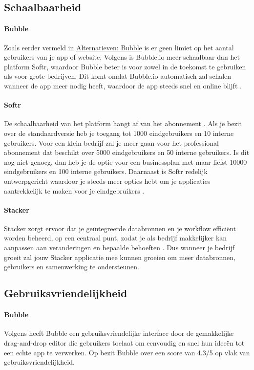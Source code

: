 \subsection{Schaalbaarheid}%
\label{subsec:schaalbaarheid}
\paragraph{Bubble}
Zoals eerder vermeld in \hyperref[subsec:bubble]{Alternatieven: Bubble} is er geen limiet op het aantal gebruikers van je app of website. Volgens \textcite{Youssef2023} is 
Bubble.io meer schaalbaar dan het platform Softr, waardoor Bubble beter is voor zowel in de toekomst te gebruiken als voor grote bedrijven. 
Dit komt omdat Bubble.io automatisch zal schalen wanneer de app meer nodig heeft, 
waardoor de app steeds snel en online blijft \autocite{Bas2024}.
\paragraph{Softr}
De schaalbaarheid van het platform hangt af van het abonnement \autocite{Frater2024}. 
Als je bezit over de standaardversie heb je toegang tot 1000 eindgebruikers en 10 interne gebruikers. 
Voor een klein bedrijf zal je meer gaan voor het professional abonnement dat beschikt over 5000 eindgebruikers en 50 interne gebruikers. Is dit nog niet genoeg, 
dan heb je de optie voor een businessplan met maar liefst 10000 eindgebruikers en 100 interne gebruikers. Daarnaast is Softr redelijk ontwerpgericht waardoor je steeds 
meer opties hebt om je applicaties aantrekkelijk te maken voor je eindgebruikers \autocite{Noloco2023}.
\paragraph{Stacker}
Stacker zorgt ervoor dat je geïntegreerde databronnen en je workflow efficiënt worden beheerd, op een centraal punt, zodat je als bedrijf makkelijker kan aanpassen aan veranderingen en 
bepaalde behoeften \autocite{Noloco2023}. Dus wanneer je bedrijf groeit zal jouw Stacker applicatie mee kunnen groeien om meer databronnen, gebruikers en samenwerking te ondersteunen.
\subsection{Gebruiksvriendelijkheid}%
\label{subsec:gebruiksvriendelijkheid}
\paragraph{Bubble}
Volgens \textcite{Czerny2024} 
heeft Bubble een gebruiksvriendelijke interface door de gemakkelijke drag-and-drop editor die gebruikers toelaat om eenvoudig en snel hun ideeën tot een echte app te verwerken. 
Op \textcite{Capterra} bezit Bubble over een score van 4.3/5 op vlak van gebruiksvriendelijkheid.
